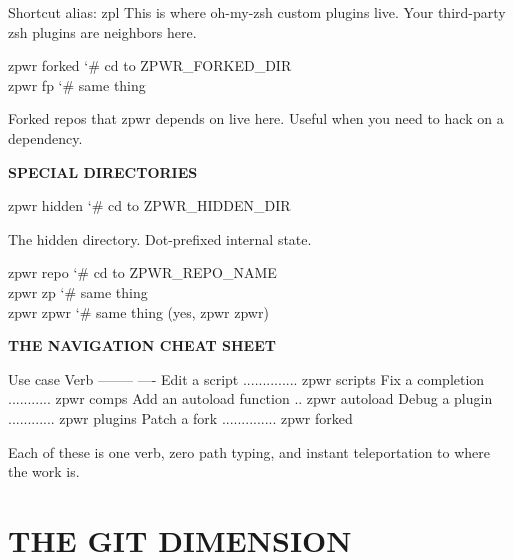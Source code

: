 \documentclass[11pt,a4paper,twoside]{book}
\begin{document}
Shortcut alias: zpl This is where oh-my-zsh custom plugins live. Your third-party zsh plugins are neighbors here.

\begin{codebox}
\color{neongreen}zpwr forked        {\char`\#} cd to ZPWR\_FORKED\_DIR\\
\color{neongreen}zpwr fp            {\char`\#} same thing\\
\end{codebox}

Forked repos that zpwr depends on live here. Useful when you need to hack on a dependency.


\vspace{12pt}
{\bfseries\color{neonyellow} SPECIAL DIRECTORIES}\vspace{4pt}

\begin{codebox}
\color{neongreen}zpwr hidden        {\char`\#} cd to ZPWR\_HIDDEN\_DIR\\
\end{codebox}

The hidden directory. Dot-prefixed internal state.

\begin{codebox}
\color{neongreen}zpwr repo          {\char`\#} cd to ZPWR\_REPO\_NAME\\
\color{neongreen}zpwr zp            {\char`\#} same thing\\
\color{neongreen}zpwr zpwr          {\char`\#} same thing (yes, zpwr zpwr)\\
\end{codebox}


\vspace{12pt}
{\bfseries\color{neonyellow} THE NAVIGATION CHEAT SHEET}\vspace{4pt}

Use case                      Verb --------                      ---- Edit a script .............. zpwr scripts Fix a completion ........... zpwr comps Add an autoload function .. zpwr autoload Debug a plugin ............ zpwr plugins Patch a fork .............. zpwr forked

Each of these is one verb, zero path typing, and instant teleportation to where the work is.


\vspace{16pt}


\chapter{THE GIT DIMENSION}
\end{document}
